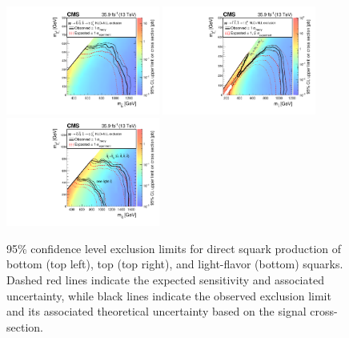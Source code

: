 \begin{figure}
	\centering
	\includegraphics[width=0.45\textwidth]{results/figs/interpretations/T2bb_35p9ifb_Moriond2017_Mar07_XSEC}
	\includegraphics[width=0.45\textwidth]{results/figs/interpretations/T2tt_35p9ifb_Moriond2017_Mar07_XSEC}
	\includegraphics[width=0.45\textwidth]{results/figs/interpretations/T2qq_35p9ifb_Moriond2017_Mar07_XSEC}
	\renewcommand{\baselinestretch}{1.0}
	\caption[95\% confidence level exclusion limits for direct squark production of bottom (top left), top (top right), and light-flavor (bottom) squarks.]{95\% confidence level exclusion limits for direct squark production of bottom (top left), top (top right), and light-flavor (bottom) squarks. Dashed red lines indicate the expected sensitivity and associated uncertainty, while black lines indicate the observed exclusion limit and its associated theoretical uncertainty based on the signal cross-section.}
	\label{fig:limitsSquark}
\end{figure}
